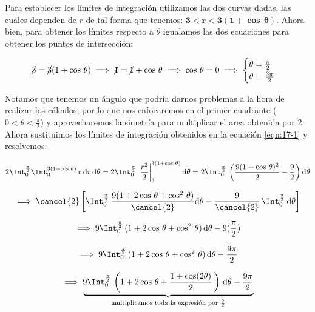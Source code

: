 \documentclass[12pt]{article}
\begin{document}
\noindent Para establecer los límites de integración utilizamos las dos curvas dadas, las cuales dependen de $r$ de tal forma que tenemos: $\boldsymbol{3<r<3(1+\cos\,\theta)}$. Ahora bien, para obtener los límites respecto a $\theta$ igualamos las dos ecuaciones para obtener los puntos de intersección:

\begin{align*}
	\cancel{3} = \cancel{3}(1 + \cos\,\theta) \implies \cancel{1} = \cancel{1} + \cos\,\theta \implies \cos\,\theta = 0 \implies \begin{cases}
		\theta = \frac{\pi}{2} \\
		\theta = \frac{3\pi}{2}
	\end{cases}
\end{align*}

\noindent Notamos que tenemos un ángulo que podría darnos problemas a la hora de realizar los cálculos, por lo que nos enfocaremos en el primer cuadrante ($0<\theta<\frac{\pi}{2}$) y aprovecharemos la simetría para multiplicar el area obtenida por 2. Ahora sustituimos los límites de integración obtenidos en la ecuación \eqref{eqn:17-1} y resolvemos:

\begin{align*}
	2\Int_{0}^{\frac{\pi}{2}} \Int_{3}^{3(1+\cos\,\theta)}\, r\,\mathrm{d}r\,\mathrm{d}\theta = 2\Int_{0}^{\frac{\pi}{2}}\, \left.\frac{r^2}{2}\right|_{3}^{3(1+\cos\,\theta)} \mathrm{d}\theta = 2\Int_{0}^{\frac{\pi}{2}}\, \left(\frac{9(1+\cos\,\theta)^2}{2}  - \frac{9}{2}\right)  \mathrm{d}\theta
\end{align*}

\begin{align*}
	\implies \cancel{2}\left[ \Int_{0}^{\frac{\pi}{2}}\, \frac{9(1+2\cos\,\theta+\cos^2\,\theta)}{\cancel{2}} \mathrm{d}\theta  - \frac{9}{\cancel{2}}\, \Int_{0}^{\frac{\pi}{2}}\, \mathrm{d}\theta \right]
\end{align*}

\begin{align*}
	\implies 9\Int_{0}^{\frac{\pi}{2}}\, (1+2\cos\,\theta+\cos^2\,\theta)\, \mathrm{d}\theta  - 9 (\frac{\pi}{2})
\end{align*}

\begin{align*}
	\implies 9\Int_{0}^{\frac{\pi}{2}}\, (1+2\cos\,\theta+\cos^2\,\theta)\, \mathrm{d}\theta  - \frac{9\pi}{2}
\end{align*}

\begin{align*}
	\implies \underbrace{9\Int_{0}^{\frac{\pi}{2}}\, \left(1+2\cos\,\theta+\frac{1+\cos(2\theta)}{2}\,\right)\, \mathrm{d}\theta - \frac{9\pi}{2}}_{\text{multiplicamos toda la expresión por $\frac{2}{2}$}}
\end{align*}
\end{document}
